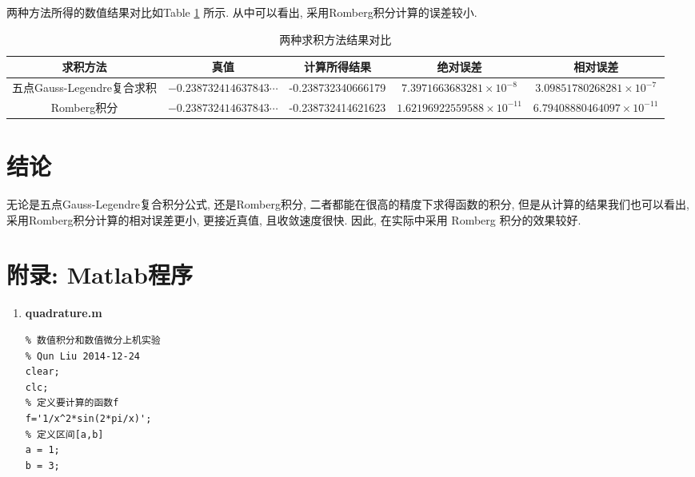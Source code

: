 \documentclass[a4paper]{article}
\begin{document}
\begin{spacing}{1.5}
\begin{CJK*}{GBK}{song}
\begin{table}[!htpb]
\begin{tiny}
\begin{center}
\begin{spacing}{1}
\begin{tabular}{ccccccccc}
\bottomrule
\end{tabular}
\end{spacing}
\end{center}
\end{tiny}
\end{table}
两种方法所得的数值结果对比如Table \ref{twomethods} 所示. 从中可以看出, 采用Romberg积分计算的误差较小.
\begin{table}[!htpb]
\begin{tiny}
\begin{center}
\begin{spacing}{1}
\caption{两种求积方法结果对比}\label{twomethods}
\begin{tabular}{ccccc}
\toprule
求积方法& 真值 & 计算所得结果  & 绝对误差  & 相对误差   \\
\midrule
五点Gauss-Legendre复合求积 & $-0.238732414637843\cdots$ & -0.238732340666179 & $7.3971663683281\times 10^{-8}$ & $3.09851780268281\times 10^{-7}$ \\
Romberg积分 & $-0.238732414637843\cdots$&  -0.238732414621623 & $1.62196922559588\times 10^{-11}$ & $6.79408880464097\times 10^{-11}$\\
\bottomrule
\end{tabular}
\end{spacing}
\end{center}
\end{tiny}
\end{table}



\section{结论}
无论是五点Gauss-Legendre复合积分公式, 还是Romberg积分, 二者都能在很高的精度下求得函数的积分, 但是从计算的结果我们也可以看出, 采用Romberg积分计算的相对误差更小, 更接近真值, 且收敛速度很快. 因此, 在实际中采用 Romberg 积分的效果较好.

\section{附录: Matlab程序}
\begin{scriptsize}
\begin{enumerate}[(1)]
\item \textbf{quadrature.m} \\
\begin{lstlisting}
% 数值积分和数值微分上机实验
% Qun Liu 2014-12-24
clear;
clc;
% 定义要计算的函数f
f='1/x^2*sin(2*pi/x)';
% 定义区间[a,b]
a = 1;
b = 3;


\end{lstlisting}
\end{enumerate}
\end{scriptsize}
\end{CJK*}
\end{spacing}
\end{document}
